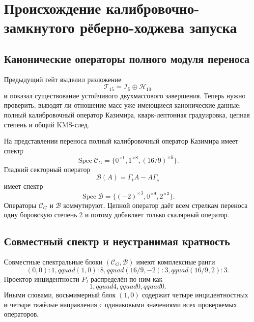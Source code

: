 \chapter{Происхождение калибровочно-замкнутого рёберно-ходжева запуска}
\label{ch:v8-gauge-closed-edge-hodge-origin-gate}

\section{Канонические операторы полного модуля переноса}

Предыдущий гейт выделил разложение
\begin{equation}
 \mathcal T_{15}=\mathcal I_5\oplus\mathcal H_{10}
 \label{eq:v8-edge-origin-desired-splitting}
\end{equation}
и показал существование устойчивого двухмассового завершения. Теперь нужно
проверить, выводят ли отношение масс уже имеющиеся канонические данные:
полный калибровочный оператор Казимира, кварк-лептонная градуировка, цепная степень и общий
KMS-след.

На представлении переноса полный калибровочный оператор Казимира имеет спектр
\begin{equation}
 \operatorname{Spec}\mathcal C_G
 =\{0^{\times1},1^{\times8},(16/9)^{\times6}\}.
 \label{eq:v8-transfer-gauge-casimir-spectrum}
\end{equation}
Гладкий секторный оператор
\begin{equation}
 \mathcal B(A)=\Gamma_tA-A\Gamma_s
 \label{eq:v8-transfer-sector-order-operator}
\end{equation}
имеет спектр
\begin{equation}
 \operatorname{Spec}\mathcal B
 =\{(-2)^{\times3},0^{\times9},2^{\times3}\}.
 \label{eq:v8-transfer-sector-order-spectrum}
\end{equation}
Операторы $\mathcal C_G$ и $\mathcal B$ коммутируют. Цепной оператор даёт
всем стрелкам переноса одну боровскую степень 2 и потому добавляет только
скалярный оператор.

\section{Совместный спектр и неустранимая кратность}

Совместные спектральные блоки $(\mathcal C_G,\mathcal B)$ имеют комплексные
ранги
\begin{equation}
 (0,0):1,qquad (1,0):8,qquad
 (16/9,-2):3,qquad (16/9,2):3.
 \label{eq:v8-casimir-sector-joint-blocks}
\end{equation}
Проектор инцидентности $P_I$ распределён по ним как
\begin{equation}
 1,qquad 4,qquad0,qquad0.
 \label{eq:v8-incidence-overlap-joint-blocks}
\end{equation}
Иными словами, восьмимерный блок $(1,0)$ содержит четыре инцидентностных и четыре
тяжёлые направления с одинаковыми значениями всех проверяемых операторов.

